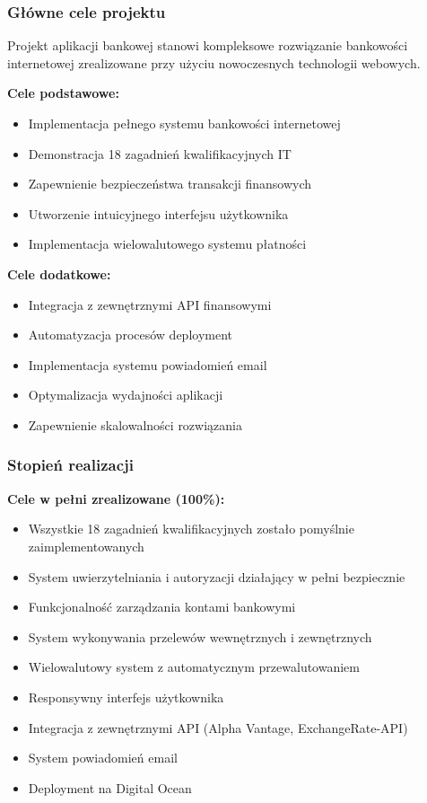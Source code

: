 \documentclass[12pt,a4paper]{article}
\begin{document}
    \subsubsection{Główne cele projektu}

    Projekt aplikacji bankowej stanowi kompleksowe rozwiązanie bankowości internetowej zrealizowane przy użyciu nowoczesnych technologii webowych.

    \textbf{Cele podstawowe:}
    \begin{itemize}
        \item Implementacja pełnego systemu bankowości internetowej
        \item Demonstracja 18 zagadnień kwalifikacyjnych IT
        \item Zapewnienie bezpieczeństwa transakcji finansowych
        \item Utworzenie intuicyjnego interfejsu użytkownika
        \item Implementacja wielowalutowego systemu płatności
    \end{itemize}

    \textbf{Cele dodatkowe:}
    \begin{itemize}
        \item Integracja z zewnętrznymi API finansowymi
        \item Automatyzacja procesów deployment
        \item Implementacja systemu powiadomień email
        \item Optymalizacja wydajności aplikacji
        \item Zapewnienie skalowalności rozwiązania
    \end{itemize}

    \subsubsection{Stopień realizacji}

    \textbf{Cele w pełni zrealizowane (100\%):}
    \begin{itemize}
        \item Wszystkie 18 zagadnień kwalifikacyjnych zostało pomyślnie zaimplementowanych
        \item System uwierzytelniania i autoryzacji działający w pełni bezpiecznie
        \item Funkcjonalność zarządzania kontami bankowymi
        \item System wykonywania przelewów wewnętrznych i zewnętrznych
        \item Wielowalutowy system z automatycznym przewalutowaniem
        \item Responsywny interfejs użytkownika
        \item Integracja z zewnętrznymi API (Alpha Vantage, ExchangeRate-API)
        \item System powiadomień email
        \item Deployment na Digital Ocean
    \end{itemize}
\end{document}
